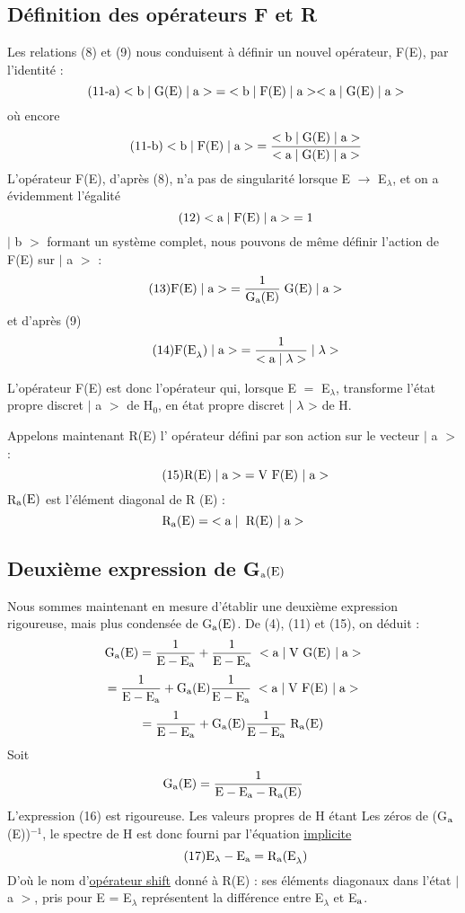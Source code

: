 \subsection{Définition des opérateurs F et R}%
Les relations (8) et (9) nous conduisent à définir un nouvel opérateur, F(E), par l'identité :
\[
\tag{11-a}<\text{b}\;|\;\text{G(E)}\;|\;\text{a}>\;=\;<\text{b}\;|\;\text{F(E)}\;|\;\text{a}><\text{a}\;|\;\text{G(E)}\;|\;\text{a}>
\]
où encore
\[
\tag{11-b}<\text{b}\;|\;\text{F(E)}\;|\;\text{a}>\;=\frac{<\text{b}\;|\;\text{G(E)}\;|\;\text{a}>}{<\text{a}\;|\;\text{G(E)}\;|\;\text{a}>}
\]
L'opérateur F(E), d'après (8), n'a pas de singularité lorsque E $\to$ E$_\lambda$, et on a évidemment l'égalité
\[
\tag{12}<\text{a}\;|\;\text{F(E)}\;|\;\text{a}>\;=1
\]
$|$ b $>$ formant un système complet, nous pouvons de même définir l'action de F(E) sur $|$ a $>$ :
\[
\tag{13}\text{F(E)}\;|\;\text{a}>\;=\frac{1}{\text{G}_{\text{a}}\text{(E)}}\;\text{G(E)}\;|\;\text{a}>
\]
et d'après (9)
\[
\tag{14}\text{F(E}_\lambda)\;|\;\text{a}>\;=\frac{1}{<\text{a}\;|\;\lambda>}\;|\;\lambda>
\]

L'opérateur F(E) est donc l'opérateur qui, lorsque E $=$ E$_\lambda$, transforme l'état propre discret $|$ a $>$ de H$_0$, en état propre discret | $\lambda$ > de H.

Appelons maintenant R(E) l' opérateur défini par son action sur le
vecteur $|$ a $>$ :
\[
\tag{15}\text{R(E)}\;|\;\text{a}>\;=\text{V F(E) }|\;\text{a}>
\]
R$_{\text{a}}\text{(E)}$ est l'élément diagonal de R (E) :
\[
\text{R}_{\text{a}}\text{(E)}=\;<\text{a}\;|\;\text{ R(E) }|\;\text{a}>
\]
\subsection{Deuxième expression de G$_{\text{a}}\text{(E)}$}%
Nous sommes maintenant en mesure d'établir une deuxième expression
rigoureuse, mais plus condensée de G$_{\text{a}}\text{(E)}$.
De (4), (11) et (15), on déduit :
\[
\text{G}_{\text{a}}\text{(E)}=\frac{1}{\text{E}-\text{E}_{\text{a}}}+\frac{1}{\text{E}-\text{E}_{\text{a}}}\;<\text{a}\;|\;\text{V G(E) }|\;\text{a}>
\]
\[
=\frac{1}{\text{E}-\text{E}_{\text{a}}}+\text{G}_{\text{a}}\text{(E)}\frac{1}{\text{E}-\text{E}_{\text{a}}}\;<\text{a}\;|\;\text{V F(E) }|\;\text{a}>
\]
\[
=\frac{1}{\text{E}-\text{E}_{\text{a}}}+\text{G}_{\text{a}}\text{(E)}\frac{1}{\text{E}-\text{E}_{\text{a}}}\;\text{R}_{\text{a}}\text{(E)}
\]
Soit
\[
\text{G}_{\text{a}}\text{(E)}=\frac{1}{\text{E}-\text{E}_{\text{a}}-\text{R}_{\text{a}}\text{(E)}}
\]
L'expression (16) est rigoureuse. Les valeurs propres de H étant Les zéros de
(G$_{\text{a}}$(E))$^{-1}$, le spectre de H est donc fourni par l'équation \ul{implicite}
\[
\tag{17}\text{E}_\lambda-\text{E}_{\text{a}}=\text{R}_{\text{a}}\text{(E}_\lambda)
\]
D'où le nom d'\ul{opérateur shift} donné à R(E) : ses éléments diagonaux dans l'état
$|$ a $>$, pris pour E = E$_\lambda$ représentent la différence entre E$_\lambda$ et E$_{\text{a}}$.


